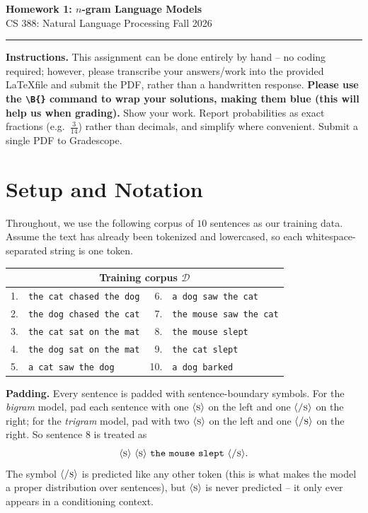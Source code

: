 \documentclass[11pt]{article}
\newcommand{\bs}{\ensuremath{\langle \textsc{s} \rangle}}
\newcommand{\es}{\ensuremath{\langle \textsc{/s} \rangle}}
\newcommand{\wrd}[1]{\texttt{#1}}
\begin{document}
\begin{center}
  {\Large\bfseries Homework 1: $n$-gram Language Models}\\[2pt]
  {\normalsize CS 388: Natural Language Processing \quad\textbullet\quad Fall 2026}\\[2pt]
\end{center}
\vspace{0.5em}
\hrule
\vspace{1em}

\noindent
\textbf{Instructions.} This assignment can be done entirely by hand -- no coding required; however, please transcribe your answers/work into the provided \LaTeX file and submit the PDF, rather than a handwritten response.
\textbf{Please use the {\tt{\textbackslash B\{\}}} command to wrap your solutions, making them blue (this will help us when grading).}
Show your work. Report probabilities as exact fractions (e.g.\ $\tfrac{3}{14}$)
rather than decimals, and simplify where convenient. Submit a single PDF to Gradescope.

\section{Setup and Notation}

Throughout, we use the following corpus of $10$ sentences as our training data. Assume the text has already
been tokenized and lowercased, so each whitespace-separated string is one token.

\begin{center}
\begin{tabular}{rl@{\hskip 3em}rl}
\toprule
\multicolumn{4}{c}{\textbf{Training corpus} $\mathcal{D}$}\\
\midrule
1. & \wrd{the cat chased the dog}   & 6.  & \wrd{a dog saw the cat}\\
2. & \wrd{the dog chased the cat}   & 7.  & \wrd{the mouse saw the cat}\\
3. & \wrd{the cat sat on the mat}   & 8.  & \wrd{the mouse slept}\\
4. & \wrd{the dog sat on the mat}   & 9.  & \wrd{the cat slept}\\
5. & \wrd{a cat saw the dog}        & 10. & \wrd{a dog barked}\\
\bottomrule
\end{tabular}
\end{center}

\noindent
\textbf{Padding.} Every sentence is padded with sentence-boundary symbols. For the \emph{bigram} model, pad each
sentence with one \bs{} on the left and one \es{} on the right; for the \emph{trigram} model, pad with two \bs{}
on the left and one \es{} on the right. So sentence 8 is treated as
\[
\bs\ \bs\ \wrd{the}\ \wrd{mouse}\ \wrd{slept}\ \es .
\]
The symbol \es{} is predicted like any other token (this is what makes the model a proper distribution over
sentences), but \bs{} is never predicted -- it only ever appears in a conditioning context.
\end{document}
